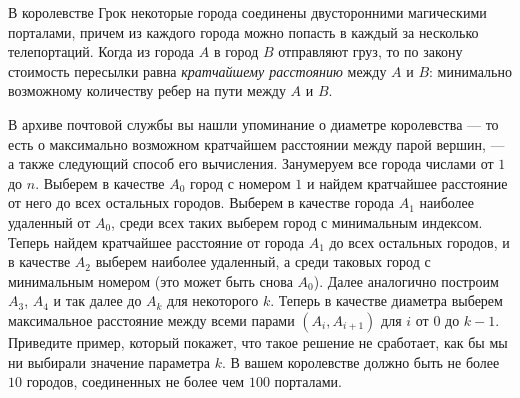 \documentclass{article}
\begin{document}
В королевстве Грок некоторые города соединены двусторонними магическими порталами, причем из каждого города можно попасть в каждый за несколько телепортаций. 
Когда из города $A$ в город $B$ отправляют груз, то по закону стоимость пересылки равна \textit{кратчайшему расстоянию} между $A$ и $B$: минимально возможному 
количеству ребер на пути между $A$ и $B$.

В архиве почтовой службы вы нашли упоминание о диаметре королевства --- то есть о максимально возможном кратчайшем расстоянии между парой вершин, --- а также 
следующий способ его вычисления. Занумеруем все города числами от $1$ до $n$. Выберем в качестве $A_0$ город с номером $1$ и найдем кратчайшее расстояние от него 
до всех остальных городов. Выберем в качестве города $A_1$ наиболее удаленный от $A_0$, среди всех таких выберем город с минимальным индексом. Теперь найдем 
кратчайшее расстояние от города $A_1$ до всех остальных городов, и в качестве $A_2$ выберем наиболее удаленный, а среди таковых город с минимальным номером 
(это может быть снова $A_0$). Далее аналогично построим $A_3$, $A_4$ и так далее до $A_k$ для некоторого $k$. Теперь в качестве диаметра выберем максимальное 
расстояние между всеми парами $(A_i, A_{i+1})$ для $i$ от $0$ до $k-1$. Приведите пример, который покажет, что такое решение не сработает, как бы мы ни 
выбирали значение параметра $k$. В вашем королевстве должно быть не более $10$ городов, соединенных не более чем $100$ порталами.
\end{document}

